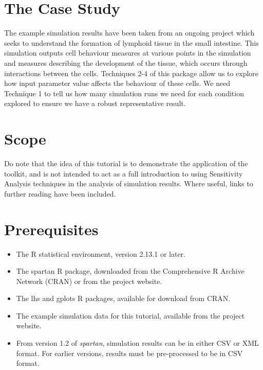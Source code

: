 \documentclass[a4paper,11pt]{article}
\begin{document}
\section{The Case Study}
\noindent The example simulation results have been taken from an ongoing project which seeks to understand the formation of lymphoid tissue in the small intestine. This simulation outputs cell behaviour measures at various points in the simulation and measures describing the development of the tissue, which occurs through interactions between the cells. Techniques 2-4 of this package allow us to explore how input parameter value affects the behaviour of these cells. We need Technique 1 to tell us how many simulation runs we need for each condition explored to ensure we have a robust representative result.

\section{Scope}
\noindent Do note that the idea of this tutorial is to demonstrate the application of the toolkit, and is not intended to act as a full introduction to using Sensitivity Analysis techniques in the analysis of simulation results. Where useful, links to further reading have been included.

\section{Prerequisites}
\begin{itemize}
\item The R statistical environment, version 2.13.1 or later.
\item The spartan R package, downloaded from the Comprehensive R Archive Network (CRAN) or from the project website.
\item The lhs and gplots R packages, available for download from CRAN.
\item The example simulation data for this tutorial, available from the project website.
\item From version 1.2 of \textit{spartan}, simulation results can be in either CSV or XML format. For earlier versions, results must be pre-processed to be in CSV format.
\end{itemize}
\end{document}
